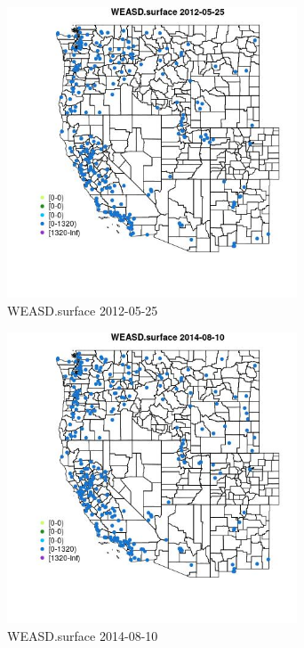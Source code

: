 \begin{figure} 
\centering  
\includegraphics[width=0.77\textwidth]{Code_Outputs/Report_ML_input_PM25_Step4_part_e_de_duplicated_aves_compiled_2019-05-18wNAs_MapObsWEASDsurface2012-05-25.jpg} 
\caption{\label{fig:Report_ML_input_PM25_Step4_part_e_de_duplicated_aves_compiled_2019-05-18wNAsMapObsWEASDsurface2012-05-25}WEASD.surface 2012-05-25} 
\end{figure} 
 

\begin{figure} 
\centering  
\includegraphics[width=0.77\textwidth]{Code_Outputs/Report_ML_input_PM25_Step4_part_e_de_duplicated_aves_compiled_2019-05-18wNAs_MapObsWEASDsurface2014-08-10.jpg} 
\caption{\label{fig:Report_ML_input_PM25_Step4_part_e_de_duplicated_aves_compiled_2019-05-18wNAsMapObsWEASDsurface2014-08-10}WEASD.surface 2014-08-10} 
\end{figure} 
 

